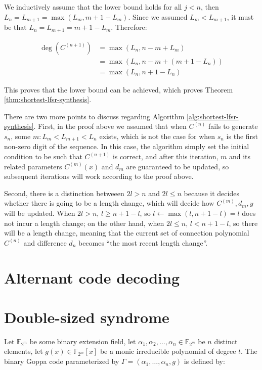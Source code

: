 \documentclass[runningheads]{llncs}
\begin{document}
We inductively assume that the lower bound holds for all $j < n$, then $L_n = L_{m+1} = \max(L_m, m+1-L_m)$. Since we assumed $L_m < L_{m+1}$, it must be that $L_n = L_{m+1} = m+1-L_m$. Therefore:

\begin{equation*}\begin{aligned}
    \deg(C^{(n+1)}) &= \max(L_n, n - m + L_m) \\
    &= \max(L_n, n - m + (m + 1 - L_n)) \\
    &= \max(L_n, n + 1 - L_n)
\end{aligned}\end{equation*}

This proves that the lower bound can be achieved, which proves Theorem \ref{thm:shortest-lfsr-synthesis}.

There are two more points to discuss regarding Algorithm \ref{alg:shortest-lfsr-synthesis}. First, in the proof above we assumed that when $C^{(n)}$ fails to generate $s_n$, some $m: L_m < L_{m+1} < L_n$ exists, which is not the case for when $s_n$ is the first non-zero digit of the sequence. In this case, the algorithm simply set the initial condition to be such that $C^{(n+1)}$ is correct, and after this iteration, $m$ and its related parameters $C^{(m)}(x)$ and $d_m$ are guaranteed to be updated, so subsequent iterations will work according to the proof above.

Second, there is a distinction betweeen $2l > n$ and $2l \leq n$ because it decides whether there is going to be a length change, which will decide how $C^{(m)}, d_m, y$ will be updated. When $2l > n$, $l \geq n + 1 - l$, so $l \leftarrow \max(l, n + 1 - l) = l$ does not incur a length change; on the other hand, when $2l \leq n$, $l < n + 1 - l$, so there will be a length change, meaning that the current set of connection polynomial $C^{(n)}$ and difference $d_n$ becomes ``the most recent length change''.

\section{Alternant code decoding}\label{sec:alternant-code-decoding}

\section{Double-sized syndrome}\label{sec:double-sized-syndrome}
Let $\mathbb{F}_{2^m}$ be some binary extension field, let $\alpha_1, \alpha_2, \ldots, \alpha_n \in \mathbb{F}_{2^m}$ be $n$ distinct elements, let $g(x)\in\mathbb{F}_{2^m}[x]$ be a monic irreducible polynomial of degree $t$. The binary Goppa code parameterized by $\Gamma = (\alpha_1, \ldots, \alpha_n, g)$ is defined by:
\end{document}
